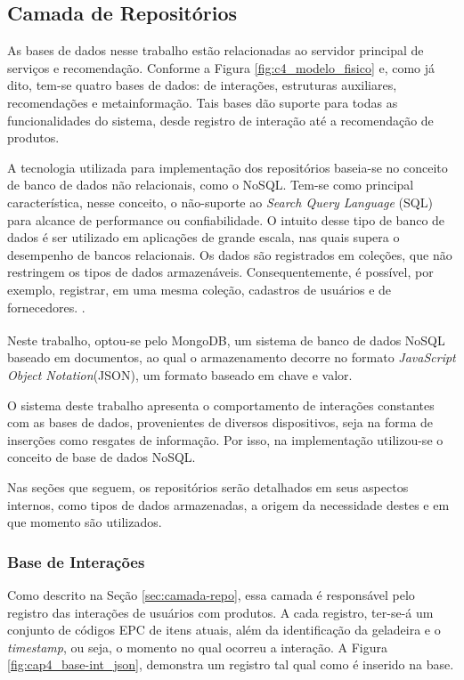 \subsection{Camada de Repositórios}

As bases de dados nesse trabalho estão relacionadas ao servidor principal de serviços e recomendação. Conforme a Figura \ref{fig:c4_modelo_fisico} e, como já dito, tem-se quatro bases de dados: de interações, estruturas auxiliares, recomendações e metainformação. Tais bases dão suporte para todas as funcionalidades do sistema, desde registro de interação até a recomendação de produtos. 

A tecnologia utilizada para implementação dos repositórios baseia-se no conceito de banco de dados não relacionais, como o NoSQL. Tem-se como principal característica, nesse conceito, o não-suporte ao \textit{Search Query Language} (SQL) para alcance de performance ou confiabilidade. O intuito desse tipo de banco de dados é ser utilizado em aplicações de grande escala, nas quais supera o desempenho de bancos relacionais. Os dados são registrados em coleções, que não restringem os tipos de dados armazenáveis. Consequentemente, é possível, por exemplo, registrar, em uma mesma coleção, cadastros de usuários e de fornecedores. \cite{Boicea2012}. 

Neste trabalho, optou-se pelo MongoDB\textsuperscript{\textregistered}, um sistema de banco de dados NoSQL baseado em documentos, ao qual o armazenamento decorre no formato \textit{JavaScript Object Notation}(JSON), um formato baseado em chave e valor. 


O sistema deste trabalho apresenta o comportamento de interações constantes com as bases de dados, provenientes de diversos dispositivos, seja na forma de inserções como resgates de informação. Por isso, na implementação utilizou-se o conceito de base de dados NoSQL.

Nas seções que seguem, os repositórios serão detalhados em seus aspectos internos, como tipos de dados armazenadas, a origem da necessidade destes e em que momento são utilizados.

\ProximoForaDoSumario 
\subsubsection{Base de Interações}

Como descrito na Seção \ref{sec:camada-repo}, essa camada é responsável pelo registro das interações de usuários com produtos. A cada registro, ter-se-á um conjunto de códigos EPC de itens atuais, além da identificação da geladeira e o \textit{timestamp}, ou seja, o momento no qual ocorreu a interação. A Figura \ref{fig:cap4_base-int_json}, demonstra um registro tal qual como é inserido na base.

